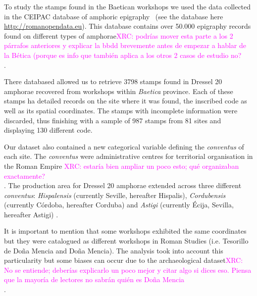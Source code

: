 \documentclass[review]{elsarticle}
\newcommand{\memo}[2]{\textcolor{#1}{#2}}
\newcommand{\xavi}[1]{\memo{magenta}{XRC: #1\\}}
\begin{document}
To study the stamps found in the Baetican workshops we used the data collected in the CEIPAC database of amphoric epigraphy~\citep{remesal_centro_2015} (see the database here \url{http://romanopendata.eu}). This database contains over 50.000 epigraphy records found on different types of amphorae\xavi{podrías mover esta parte a los 2 párrafos anteriores y explicar la bbdd brevemente antes de empezar a hablar de la Bética (porque es info que también aplica a los otros 2 casos de estudio no?}.

There databased allowed us to retrieve 3798 stamps found in Dressel 20 amphorae recovered from workshops within \textit{Baetica} province. Each of these stamps ha detailed records on the site where it was found, the inscribed code as well as its spatial coordinates. The stamps with incomplete information were discarded, thus finishing with a sample of 987 stamps from 81 sites and displaying 130 different code.


Our dataset also contained a new categorical variable defining the \textit{conventus} of each site. The \textit{conventus} were administrative centres for territorial organisation in the Roman Empire \citep[58]{ozcariz_gil_administracion_2013}\xavi{estaría bien ampliar un poco esto; qué organizaban exactamente?}. The production area for Dressel 20 amphorae extended across three different \textit{conventus}: \textit{Hispalensis} (currently Seville, hereafter Hispalis), \textit{Cordubensis} (currently C\'ordoba, hereafter Corduba) and \textit{Astigi} (currently Écija, Sevilla, hereafter Astigi) \citep{rodriguez_economioleicola_1977,chicdatos2001,berni_millet_epigrafianforica_2008} . 


It is important to mention that some workshops exhibited the same coordinates but they were catalogued as different workshops in Roman Studies (i.e. Tesorillo de Doña Mencia and Doña Mencia). The analysis took into account this particularity but some biases can occur due to the archaeological dataset\xavi{No se entiende; deberías explicarlo un poco mejor y citar algo si dices eso. Piensa que la mayoría de lectores no sabrán quién es Doña Mencia}. 
\end{document}
